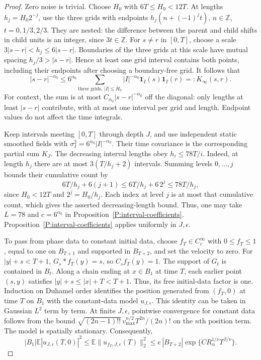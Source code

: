 \documentclass[12pt]{article}
\numberwithin{equation}{section}
\theoremstyle{definition}
\newcommand{\E}{\mathbb{E}}
\begin{document}
\begin{proof}
  Zero noise is trivial. Choose $H_0$ with $6T\le H_0<12T$.
  At lengths $h_j=H_0 2^{-j}$, use the three grids with endpoints
  $h_j(n+(-1)^j t)$, $n\in\mathbb Z$, $t=0,1/3,2/3$.
  They are nested: the difference between the parent and child shifts
  in child units is an integer, since $3t\in\mathbb Z$.
  For $s\ne r$ in $[0,T]$, choose a scale
  $3|s-r|<h_j\le6|s-r|$.
  Boundaries of the three grids at this scale have mutual spacing
  $h_j/3>|s-r|$. Hence at least one grid interval contains both points,
  including their endpoints after choosing a boundary-free grid.
  It follows that
  \begin{equation}\label{E:dyadic-time-majorant}
    |s-r|^{-\alpha_0}
    \le6^{\alpha_0}\sum_{\text{three grids},\,|I|\le H_0}
    |I|^{-\alpha_0}\mathbf1_I(s)\mathbf1_I(r)=:K_\infty(s,r).
  \end{equation}
  For context, the sum is at most $C_{\alpha_0}|s-r|^{-\alpha_0}$ off the diagonal:
  only lengths at least $|s-r|$ contribute, with at most one interval
  per grid and length. Endpoint values do not affect the time integrals.

  Keep intervals meeting $[0,T]$ through depth $J$, and use independent
  static smoothed fields with $\sigma_I^2=6^{\alpha_0}|I|^{-\alpha_0}$.
  Their time covariance is the corresponding partial sum $K_J$.
  The decreasing interval lengths obey $h_i\le78T/i$.
  Indeed, at length $h_j$ there are at most $3(T/h_j+2)$ intervals.
  Summing levels $0,\ldots,j$ bounds their cumulative count by
  \[
    6T/h_j+6(j+1)\le6T/h_j+6\,2^j\le78T/h_j,
  \]
  since $H_0<12T$ and $2^j=H_0/h_j$.
  Each index at level $j$ is at most that cumulative count, which gives
  the asserted decreasing-length bound. Thus, one may take $L=78$
  and $c=6^{\alpha_0}$ in Proposition~\ref{P:interval-coefficients}.
  Proposition~\ref{P:interval-coefficients} applies uniformly in $J,\epsilon$.

  To pass from phase data to constant initial data, choose
  $f_T\in C_c^\infty$ with $0\le f_T\le1$, equal to one on $B_{T+1}$
  and supported in $B_{T+2}$, and set the velocity to zero.
  For $|y|+s<T+1$, $G_s*f_T(y)=s$, so $C_sf_T(y)=1$.
  The support of $G_t$ is contained in $B_t$.
  Along a chain ending at $x\in B_1$ at time $T$, each earlier point
  $(s,y)$ satisfies $|y|+s\le|x|+T<T+1$.
  Thus, its free initial-data factor is one.
  Induction on Duhamel order identifies the position generated
  from $(f_T,0)$ at time $T$ on $B_1$ with the constant-data model
  $u_{J,\epsilon}$.
  This identity can be taken in Gaussian $L^2$ term by term.
  At finite $J,\epsilon$, pointwise convergence for constant data follows
  from the bound
  $\sqrt{(2n-1)!!}\,v_{\max}^{n/2}T^{2n}/(2n)!$
  on the $n$th position term.
  The model is spatially stationary. Consequently,
  \[
    |B_1|\E|u_{J,\epsilon}(T,0)|^2
    \le\E\|u_{f_T,J,\epsilon}(T)\|_2^2
    \le e\,|B_{T+2}|\exp\{C R_\alpha^{1/\nu}T^{\beta/\nu}\}.
  \]


\end{proof}
\end{document}
